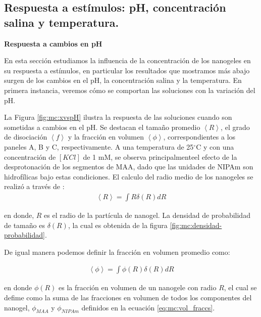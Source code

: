 	
	
	\subsection{Respuesta a est\'imulos: pH, concentraci\'on salina y temperatura.}\label{sec:mc:phs_salt_temp}
	
	\textbf{Respuesta a cambios en pH}
	
	En esta secci\'on estudiamos la influencia de la concentraci\'on de los nanogeles en su respuesta a est\'imulos, en particular los resultados que mostramos m\'as abajo surgen de los cambios en el pH, la concentraci\'on salina y la temperatura. En primera instancia, veremos c\'omo se comportan las soluciones con la variaci\'on del pH. %
	
	La Figura \ref{fig:mc:xvspH} ilustra la respuesta de las soluciones cuando son sometidas a cambios en el pH. Se destacan el tama\~no promedio $\left<R\right>$, el grado de disociaci\'on $\left<f\right>$ y la fracci\'on en volumen $\left<\phi\right>$, correspondientes a los paneles A, B y C, respectivamente. A una temperatura de 25$^\circ$C y con una concentraci\'on de $[KCl]$ de 1 mM, se observa principalmenteel efecto de la desprotonaci\'on de los segmentos de MAA, dado que las unidades de NIPAm son hidrof\'ilicas bajo estas condiciones.
	El calculo  del radio medio de los nanogeles se realiz\'o a trav\'es de :
	\begin{align}
		\left< R\right> = \int R\delta(R)dR
	\end{align} 
	
	\noindent en donde, $R$ es el radio de la part\'icula de nanogel. La densidad de probabilidad de tama\~no es $\delta(R)$, la cual es obtenida de la figura \ref{fig:mc:densidad-probabilidad}.
	
	De igual manera podemos definir la fracci\'on en volumen promedio como:
	
		\begin{align}
		\left< \phi \right> = \int \phi(R)\delta(R)dR
	\end{align} 
	
	\noindent en donde $\phi(R)$ es la fracci\'on en volumen de un nanogele con radio $R$, el cual se defime como la suma de las fracciones en volumen de todos los componentes del nanogel, $\phi_{MAA}$ y $\phi_{NIPAm}$ definidos en la ecuaci\'on \ref{eq:mc:vol_fraccs}.
	

